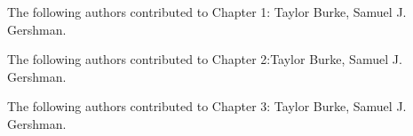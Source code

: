 \noindent The following authors contributed to Chapter 1: Taylor Burke, Samuel J. Gershman.

\noindent The following authors contributed to Chapter 2:Taylor Burke, Samuel J. Gershman.

\noindent The following authors contributed to Chapter 3: Taylor Burke, Samuel J. Gershman.